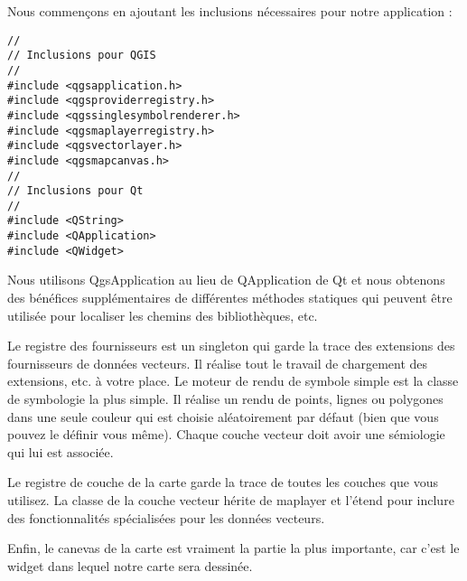 Nous commen\c{c}ons en ajoutant les inclusions n\'ecessaires pour notre application :

\begin{verbatim}
//
// Inclusions pour QGIS
//
#include <qgsapplication.h>
#include <qgsproviderregistry.h>
#include <qgssinglesymbolrenderer.h>
#include <qgsmaplayerregistry.h>
#include <qgsvectorlayer.h>
#include <qgsmapcanvas.h>
//
// Inclusions pour Qt
//
#include <QString>
#include <QApplication>
#include <QWidget>
\end{verbatim}

Nous utilisons QgsApplication au lieu de QApplication de Qt et nous obtenons des
b\'en\'efices suppl\'ementaires de diff\'erentes m\'ethodes statiques qui peuvent \^etre
utilis\'ee pour localiser les chemins des biblioth\`eques, etc.

Le registre des fournisseurs est un singleton qui garde la trace des extensions 
des fournisseurs de donn\'ees vecteurs. Il r\'ealise tout le travail de chargement 
des extensions, etc. \`a votre place. Le moteur de rendu de symbole simple est la 
classe de symbologie la plus simple. Il r\'ealise un rendu de points, lignes ou 
polygones dans une seule couleur qui est choisie al\'eatoirement par d\'efaut (bien 
que vous pouvez le d\'efinir vous m\^eme). Chaque couche vecteur doit avoir une 
s\'emiologie qui lui est associ\'ee.

Le registre de couche de la carte garde la trace de toutes les couches que vous 
utilisez. La classe de la couche vecteur h\'erite de maplayer et l'\'etend pour 
inclure des fonctionnalit\'es sp\'ecialis\'ees pour les donn\'ees vecteurs.

Enfin, le canevas de la carte est vraiment la partie la plus importante, car c'est le widget 
dans lequel notre carte sera dessin\'ee.

